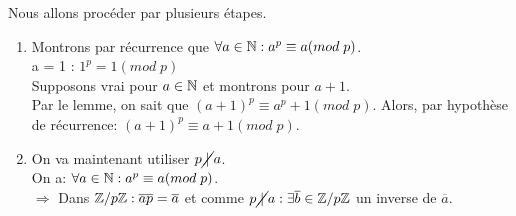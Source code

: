 \begin{demo}
Nous allons procéder par plusieurs étapes.\\

\begin{enumerate}
	\item Montrons par récurrence que $\forall a \in \mathbb{N}: a^p \equiv a(mod\;p)$.\\
	a = 1 : $1^p = 1(mod\;p)$\\
	Supposons vrai pour $a \in \mathbb{N}$ et montrons pour $a+1$.\\
	Par le lemme, on sait que $(a+1)^p \equiv a^p + 1(mod\;p)$. Alors, par hypothèse de récurrence: $(a+1)^p \equiv a + 1(mod\;p)$.\\
	\item On va maintenant utiliser $p\cancel{\;|\;}a$.\\
	On a: $\forall a \in \mathbb{N}: a^p \equiv a(mod\;p)$.\\
	$\Rightarrow$ Dans $\mathbb{Z}/p\mathbb{Z}: \overline{ap}=\overline{a}$ et comme $p\cancel{\;|\;}a: \exists \overline{b} \in \mathbb{Z}/p\mathbb{Z}$ un inverse de $\overline{a}$.\\

\end{enumerate}
\end{demo}